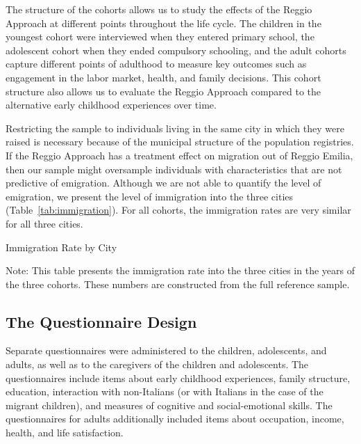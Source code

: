 The structure of the cohorts allows us to study the effects of the Reggio Approach at different points throughout the life cycle. The children in the youngest cohort were interviewed when they entered primary school, the adolescent cohort when they ended compulsory schooling, and the adult cohorts capture different points of adulthood to measure key outcomes such as engagement in the labor market, health, and family decisions. This cohort structure also allows us to evaluate the Reggio Approach compared to the alternative early childhood experiences over time.

Restricting the sample to individuals living in the same city in which they were raised is necessary because of the municipal structure of the population registries. If the Reggio Approach has a treatment effect on migration out of Reggio Emilia, then our sample might oversample individuals with characteristics that are not predictive of emigration. Although we are not able to quantify the level of emigration, we present the level of immigration into the three cities (Table~\ref{tab:immigration}). For all cohorts, the immigration rates are very similar for all three cities. 

\begin{table}[H]
\centering
\begin{threeparttable}
	\caption{Immigration Rate by City}\label{tab:immigration}
	
\begin{tablenotes}
\footnotesize
Note: This table presents the immigration rate into the three cities in the years of the three cohorts. These numbers are constructed from the full reference sample.
\end{tablenotes}
\end{threeparttable}
\end{table}

\subsection{The Questionnaire Design}

Separate questionnaires were administered to the children, adolescents, and adults, as well as to the caregivers of the children and adolescents. The questionnaires include items about early childhood experiences, family structure, education, interaction with non-Italians (or with Italians in the case of the migrant children), and measures of cognitive and social-emotional skills. The questionnaires for adults additionally included items about occupation, income, health, and life satisfaction. 


